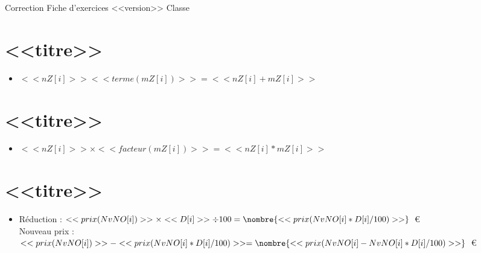 {Correction} \hfill {\huge Fiche d'exercices \no <<version>>} \hfill {Classe}

\section{<<titre>>}
\begin{itemize}

  \item $<<nZ[i]>> <<terme(mZ[i])>>=<<nZ[i]+mZ[i]>>$
\end{itemize}

\section{<<titre>>}
\begin{itemize}

  \item $<<nZ[i]>>\times<<facteur(mZ[i])>>=<<nZ[i]*mZ[i]>>$
\end{itemize}

\section{<<titre>>}
\begin{itemize}

  \item Réduction : $<<prix(NvNO[i])>>\times<<D[i]>>\div100=\nombre{<<prix(NvNO[i]*D[i]/100)>>}$~€\\
  Nouveau prix : $<<prix(NvNO[i])>>-<<prix(NvNO[i]*D[i]/100)>>=\nombre{<<prix(NvNO[i]-NvNO[i]*D[i]/100)>>}$~€
\end{itemize}
